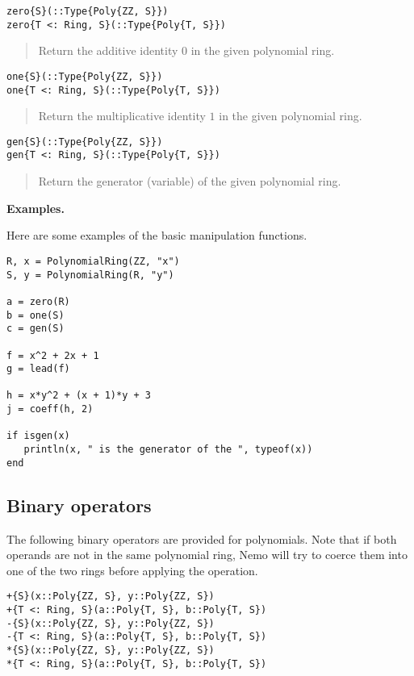 \documentclass[a4paper,10pt]{article}
\newcommand{\desc}[1]{\vspace{-3mm}\begin{quote}#1\end{quote}}
\begin{document}
{{{{{{\begin{lstlisting}
zero{S}(::Type{Poly{ZZ, S}})
zero{T <: Ring, S}(::Type{Poly{T, S}})
\end{lstlisting}

\desc{Return the additive identity $0$ in the given polynomial ring.}

\begin{lstlisting}
one{S}(::Type{Poly{ZZ, S}})
one{T <: Ring, S}(::Type{Poly{T, S}})
\end{lstlisting}

\desc{Return the multiplicative identity $1$ in the given polynomial ring.}

\begin{lstlisting}
gen{S}(::Type{Poly{ZZ, S}})
gen{T <: Ring, S}(::Type{Poly{T, S}})
\end{lstlisting}

\desc{Return the generator (variable) of the given polynomial ring.}

\textbf{Examples.}

Here are some examples of the basic manipulation functions.

\begin{lstlisting}
R, x = PolynomialRing(ZZ, "x")
S, y = PolynomialRing(R, "y")

a = zero(R)
b = one(S)
c = gen(S)

f = x^2 + 2x + 1
g = lead(f)

h = x*y^2 + (x + 1)*y + 3
j = coeff(h, 2)

if isgen(x)
   println(x, " is the generator of the ", typeof(x))
end
\end{lstlisting}

\subsection{Binary operators}

The following binary operators are provided for polynomials. Note that
if both operands are not in the same polynomial ring, Nemo will try to
coerce them into one of the two rings before applying the operation.

\begin{lstlisting}
+{S}(x::Poly{ZZ, S}, y::Poly{ZZ, S})
+{T <: Ring, S}(a::Poly{T, S}, b::Poly{T, S})
-{S}(x::Poly{ZZ, S}, y::Poly{ZZ, S})
-{T <: Ring, S}(a::Poly{T, S}, b::Poly{T, S})
*{S}(x::Poly{ZZ, S}, y::Poly{ZZ, S})
*{T <: Ring, S}(a::Poly{T, S}, b::Poly{T, S})
\end{lstlisting}

}}}}}}
\end{document}

